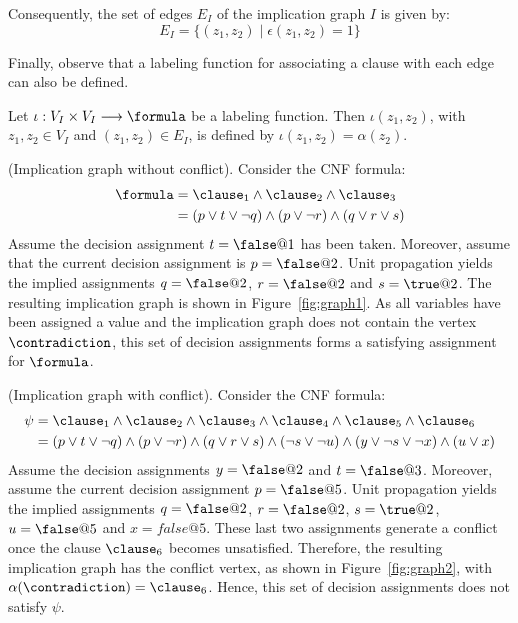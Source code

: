 Consequently, the set of edges $E_I$ of the implication graph $I$ is given by:
\begin{equation}
    E_I = \{ (z_1, z_2) \mid \epsilon(z_1, z_2) = 1\}
\end{equation}

Finally, observe that a labeling function for associating a clause with each
edge can also be defined. 

\begin{definition}
    Let $\iota : V_I \times V_I \longrightarrow \formula$ be a labeling
    function. Then $\iota(z_1, z_2)$, with $z_1, z_2 \in V_I$ and $(z_1, z_2)
    \in E_I$, is defined by $\iota(z_1, z_2) = \alpha(z_2)$.
\end{definition}

\begin{example}%
    \label{ex:graph1}
    (Implication graph without conflict). Consider the CNF formula:
    \begin{align*}
        \formula & = \clause_1 \land \clause_2 \land \clause_3\\
                 & = (p \lor t \lor \neg q) \land (p \lor \neg r) \land (q \lor r \lor s)
    \end{align*}
    Assume the decision assignment $t = \false @1$ has been taken. Moreover,
    assume that the current decision assignment is $p = \false @2$. Unit
    propagation yields the implied assignments $q = \false @2$, $r = \false @2$
    and $s = \true @2$. The resulting implication graph is shown in
    Figure~\ref{fig:graph1}. As all variables have been assigned a value and the
    implication graph does not contain the vertex $\contradiction$, this set of decision
    assignments forms a satisfying assignment for $\formula$.
    
\end{example}

\begin{example}%
    \label{ex:graph2}
    (Implication graph with conflict). Consider the CNF formula:
    \begin{align*}
        \psi & = \clause_1 \land \clause_2 \land \clause_3 \land \clause_4 \land \clause_5 \land \clause_6  \\
                 & = (p \lor t \lor \neg q) \land (p \lor \neg r) \land (q \lor r \lor s) \land (\neg s \lor \neg u) \land (y \lor \neg s \lor \neg x) \land (u \lor x)
    \end{align*}
    Assume the decision assignments $y = \false @2$ and $t = \false @3$.
    Moreover, assume the current decision assignment $p = \false @5$.  Unit
    propagation yields the implied assignments $q = \false @2$, $r = \false @2$,
    $s = \true @2$, $u = \false @5$ and $x = false @5$. These last two
    assignments generate a conflict once the clause $\clause_6$ becomes
    unsatisfied. Therefore, the resulting implication graph has the conflict
    vertex, as shown in Figure~\ref{fig:graph2}, with $\alpha(\contradiction) =
    \clause_6$.  Hence, this set of decision assignments does not satisfy
    $\psi$.
    
\end{example}

